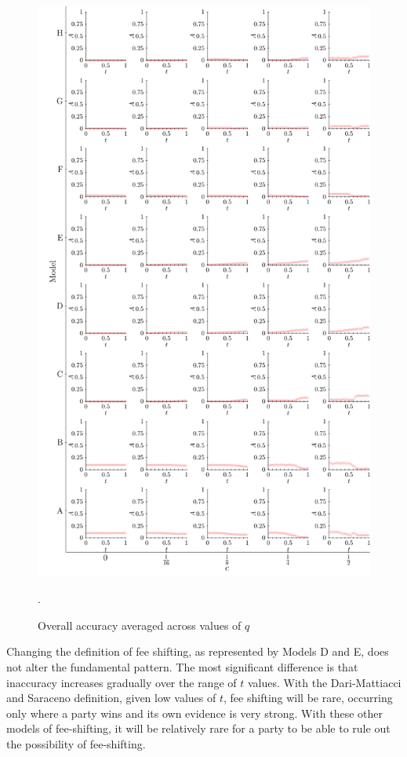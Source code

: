 \documentclass{article}
\begin{document}
\begin{figure}[h!]
\centering
\includegraphics[scale=0.55, trim={0.05in 0.15in 0in 0in}, clip]{../Figures/AverageAccuracy.pdf}
\vspace*{-2mm}
\caption{Overall accuracy averaged across values of $q$}. 
\label{fig:aggregatedaccuracy}
\end{figure}

Changing the definition of fee shifting, as represented by Models D and E, does not alter the fundamental pattern. The most significant difference is that inaccuracy increases gradually over the range of $t$ values. With the Dari-Mattiacci and Saraceno definition, given low values of $t$, fee shifting will be rare, occurring only where a party wins and its own evidence is very strong. With these other models of fee-shifting, it will be relatively rare for a party to be able to rule out the possibility of fee-shifting. 
\end{document}
